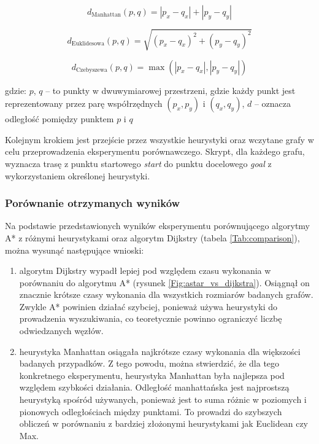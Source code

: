\documentclass[12pt,twoside]{article}
\begin{document}
\begin{equation}
d_{\text{Manhattan}}(p, q) = |p_x - q_x| + |p_y - q_y|
\label{Eq:manhattan}
\end{equation}

\begin{equation}
d_{\text{Euklidesowa}}(p, q) = \sqrt{(p_x - q_x)^2 + (p_y - q_y)^2}
\label{Eq:euclidean}
\end{equation}

\begin{equation}
d_{\text{Czebyszewa}}(p, q) = \max(|p_x - q_x|, |p_y - q_y|)
\label{Eq:czebyszewa}
\end{equation}

gdzie: $p$, $q$ -- to punkty w dwuwymiarowej przestrzeni, gdzie każdy punkt jest reprezentowany przez parę współrzędnych $(p_x, p_y)$ i $(q_x, q_y)$, $d$ -- oznacza odległość pomiędzy punktem $p$ i $q$ \\

\newpage

Kolejnym krokiem jest przejście przez wszystkie heurystyki oraz wczytane grafy w celu przeprowadzenia eksperymentu porównawczego. Skrypt, dla każdego grafu, wyznacza trasę z punktu startowego \textit{start} do punktu docelowego \textit{goal} z wykorzystaniem określonej heurystyki.

\subsubsection{Porównanie otrzymanych wyników}

Na podstawie przedstawionych wyników eksperymentu porównującego algorytmy A* z różnymi heurystykami oraz algorytm Dijkstry (tabela \ref{Tab:comparison}), można wysunąć następujące wnioski:

\begin{enumerate}[label=\alph*), leftmargin=1.25cm]
	\item algorytm Dijkstry wypadł lepiej pod względem czasu wykonania w porównaniu do algorytmu A* (rysunek \ref{Fig:astar_vs_dijkstra}). Osiągnął on znacznie krótsze czasy wykonania dla wszystkich rozmiarów badanych grafów. Zwykle A* powinien działać szybciej, ponieważ używa heurystyki do prowadzenia wyszukiwania, co teoretycznie powinno ograniczyć liczbę odwiedzanych węzłów.
	\item heurystyka Manhattan osiągała najkrótsze czasy wykonania dla większości badanych przypadków. Z tego powodu, można stwierdzić, że dla tego konkretnego eksperymentu, heurystyka Manhattan była najlepsza pod względem szybkości działania. Odległość manhattańska jest najprostszą heurystyką spośród używanych, ponieważ jest to suma różnic w poziomych i pionowych odległościach między punktami. To prowadzi do szybszych obliczeń w porównaniu z bardziej złożonymi heurystykami jak Euclidean czy Max.
\end{enumerate}
\end{document}
